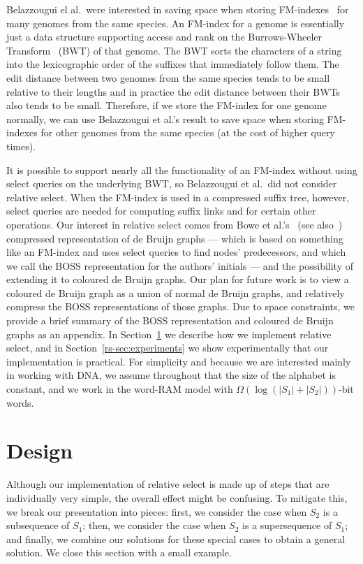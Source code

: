 Belazzougui el al.\ were interested in saving space when storing FM-indexes~\cite{FM05} for many genomes from the same species.  An FM-index for a genome is essentially just a data structure supporting access and rank on the Burrows-Wheeler Transform~\cite{BW94} (BWT) of that genome.  The BWT sorts the characters of a string into the lexicographic order of the suffixes that immediately follow them.  The edit distance between two genomes from the same species tends to be small relative to their lengths and in practice the edit distance between their BWTs also tends to be small.  Therefore, if we store the FM-index for one genome normally, we can use Belazzougui et al.'s result to save space when storing FM-indexes for other genomes from the same species (at the cost of higher query times).

It is possible to support nearly all the functionality of an FM-index without using select queries on the underlying BWT, so Belazzougui et al.\ did not consider relative select.  When the FM-index is used in a compressed suffix tree, however, select queries are needed for computing suffix links and for certain other operations.  Our interest in relative select comes from Bowe et al.'s~\cite{BOSS12} (see also~\cite{varorder-dcc}) compressed representation of de Bruijn graphs --- which is based on something like an FM-index and uses select queries to find nodes' predecessors, and which we call the BOSS representation for the authors' initials --- and the possibility of extending it to coloured de Bruijn graphs.  Our plan for future work is to view a coloured de Bruijn graph as a union of normal de Bruijn graphs, and relatively compress the BOSS representations of those graphs.  Due to space constraints, we provide a brief summary of the BOSS representation and coloured de Bruijn graphs as an appendix.  In Section~\ref{rs-sec:design} we describe how we implement relative select, and in Section~\ref{rs-sec:experiments} we show experimentally that our implementation is practical.  For simplicity and because we are interested mainly in working with DNA, we assume throughout that the size of the alphabet is constant, and we work in the word-RAM model with \(\Omega (\log (|S_1| + |S_2|))\)-bit words.

\section{Design}
\label{rs-sec:design}

Although our implementation of relative select is made up of steps that are individually very simple, the overall effect might be confusing.  To mitigate this, we break our presentation into pieces: first, we consider the case when $S_2$ is a subsequence of $S_1$; then, we consider the case when $S_2$ is a supersequence of $S_1$; and finally, we combine our solutions for these special cases to obtain a general solution.  We close this section with a small example.

